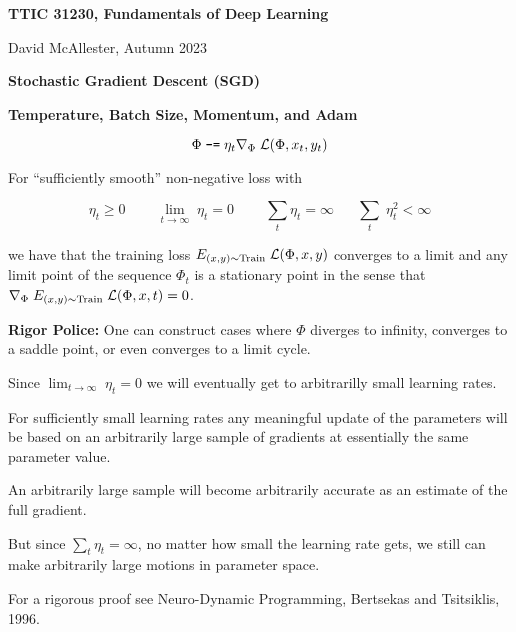 


\newcommand{\solution}[1]{\bigskip {\bf Solution}: #1}



{\Huge
  \centerline{\bf TTIC 31230, Fundamentals of Deep Learning}
  \bigskip
  \centerline{David McAllester, Autumn 2023}
  \vfill
  \centerline{\bf Stochastic Gradient Descent (SGD)}
  \vfill
  \vfill
  \centerline{\bf Temperature, Batch Size, Momentum, and Adam}



$$\Phi \;\mbox{\tt -=} \; \eta_t \nabla_\Phi\;{\cal L}(\Phi,x_t,y_t)$$

\vfill
For ``sufficiently smooth'' non-negative loss with

\vfill
$$\eta_t \geq 0\;\;\;\;\;\;\;\;\lim_{t \rightarrow \infty} \;\eta_t = 0\;\;\;\;\;\;\;\;\sum_t \eta_t = \infty \;\;\;\;\;\;\sum_t \;\eta_t^2 < \infty$$

\vfill
we have that the training loss $E_{(x,y) \sim \mathrm{Train}}\; {\cal L}(\Phi,x,y)$ converges to a limit and any limit point of the sequence $\Phi_t$
is a stationary point in the sense that {\huge  $\nabla_\Phi \; E_{(x,y) \sim \mathrm{Train}} \;{\cal L}(\Phi,x,t) = 0$}.

\vfill
{\Large
\vfill
{\bf Rigor Police:} One can construct cases where $\Phi$ diverges to infinity, converges to a saddle point, or even converges to a limit cycle.

}


Since $\lim_{t \rightarrow \infty} \;\eta_t = 0$ we will eventually get to arbitrarilly small learning rates.

\vfill
For sufficiently small learning rates any meaningful update of the parameters will be based on an arbitrarily large sample
of gradients at essentially the same parameter value.

\vfill
An arbitrarily large sample will become arbitrarily accurate as an estimate of the full gradient.

\vfill
But since $\sum_t \eta_t = \infty$, no matter how small the learning rate gets, we still can make arbitrarily large motions in parameter space.


\vfill
{\Large
\vfill
For a rigorous proof see Neuro-Dynamic Programming, Bertsekas and Tsitsiklis, 1996.}


}
